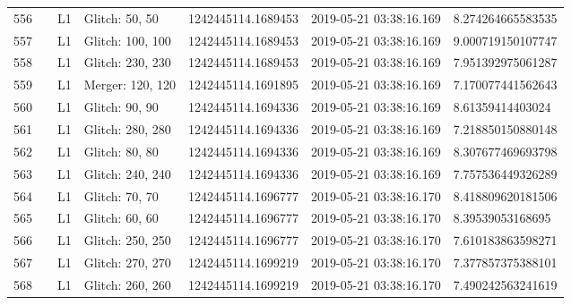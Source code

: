 \begin{longtable}{lllllll}
556  &                                                    &       L1 &    Glitch: 50, 50 &  1242445114.1689453 &  2019-05-21 03:38:16.169 &   8.274264665583535 \\
557  &                                                    &       L1 &  Glitch: 100, 100 &  1242445114.1689453 &  2019-05-21 03:38:16.169 &   9.000719150107747 \\
558  &                                                    &       L1 &  Glitch: 230, 230 &  1242445114.1689453 &  2019-05-21 03:38:16.169 &   7.951392975061287 \\
559  &                                                    &       L1 &  Merger: 120, 120 &  1242445114.1691895 &  2019-05-21 03:38:16.169 &   7.170077441562643 \\
560  &                                                    &       L1 &    Glitch: 90, 90 &  1242445114.1694336 &  2019-05-21 03:38:16.169 &    8.61359414403024 \\
561  &                                                    &       L1 &  Glitch: 280, 280 &  1242445114.1694336 &  2019-05-21 03:38:16.169 &   7.218850150880148 \\
562  &                                                    &       L1 &    Glitch: 80, 80 &  1242445114.1694336 &  2019-05-21 03:38:16.169 &   8.307677469693798 \\
563  &                                                    &       L1 &  Glitch: 240, 240 &  1242445114.1694336 &  2019-05-21 03:38:16.169 &   7.757536449326289 \\
564  &                                                    &       L1 &    Glitch: 70, 70 &  1242445114.1696777 &  2019-05-21 03:38:16.170 &   8.418809620181506 \\
565  &                                                    &       L1 &    Glitch: 60, 60 &  1242445114.1696777 &  2019-05-21 03:38:16.170 &    8.39539053168695 \\
566  &                                                    &       L1 &  Glitch: 250, 250 &  1242445114.1696777 &  2019-05-21 03:38:16.170 &   7.610183863598271 \\
567  &                                                    &       L1 &  Glitch: 270, 270 &  1242445114.1699219 &  2019-05-21 03:38:16.170 &   7.377857375388101 \\
568  &                                                    &       L1 &  Glitch: 260, 260 &  1242445114.1699219 &  2019-05-21 03:38:16.170 &   7.490242563241619 \\

\end{longtable}
